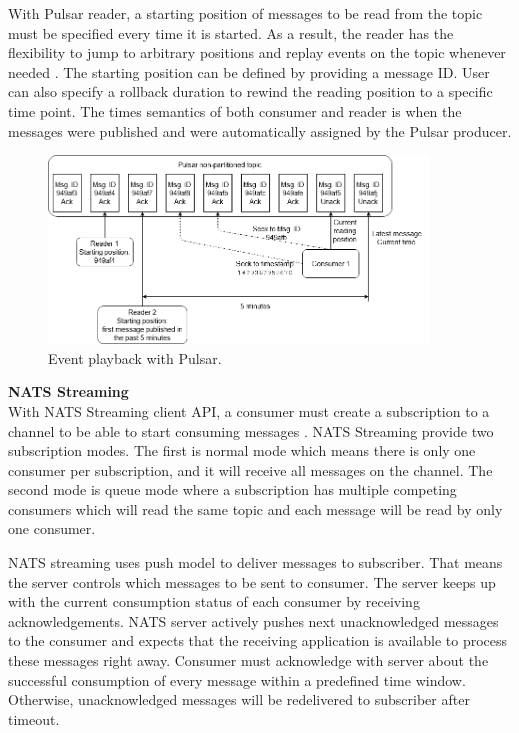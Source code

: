 With Pulsar reader, a starting position of messages to be read from the topic must be specified every time it is started. As a result, the reader has the flexibility to jump to arbitrary positions and replay events on the topic whenever needed \cite{pulsarreaderapi}. The starting position can be defined by providing a message ID. User can also specify a rollback duration to rewind the reading position to a specific time point. The times semantics of both consumer and reader is when the messages were published and were automatically assigned by the Pulsar producer.
\begin{figure}[h]
	\centering
	\includegraphics[width=\linewidth,height=5cm]{images/event-playback-pulsar.png}
	\caption{Event playback with Pulsar.}
	\label{fig:pulsareventplayback}
\end{figure}

\large \textbf{NATS Streaming}\\
\normalsize
With NATS Streaming client API, a consumer must create a subscription to a channel to be able to start consuming messages \cite{natsconceptchannels}. NATS Streaming provide two subscription modes. The first is normal mode which means there is only one consumer per subscription, and it will receive all messages on the channel. The second mode is queue mode where a subscription has multiple competing consumers which will read the same topic and each message will be read by only one consumer. 

NATS streaming uses push model to deliver messages to subscriber. That means the server controls which messages to be sent to consumer. The server keeps up with the current consumption status of each consumer by receiving acknowledgements. NATS server actively pushes next unacknowledged messages to the consumer and expects that the receiving application is available to process these messages right away. Consumer must acknowledge with server about the successful consumption of every message within a predefined time window. Otherwise, unacknowledged messages will be redelivered to subscriber after timeout. 
 
